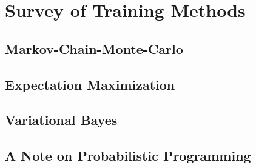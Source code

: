 \chapter{Survey of Training Methods}

\section{Markov-Chain-Monte-Carlo}

\section{Expectation Maximization}

\section{Variational Bayes}

\section{A Note on Probabilistic Programming}

